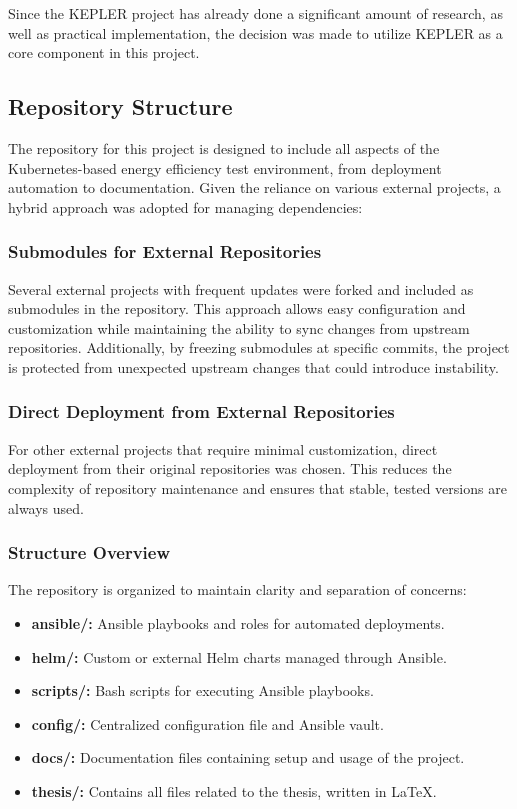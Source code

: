 Since the KEPLER project has already done a significant amount of research, as well as practical implementation, the decision was made to utilize KEPLER as a core component in this project. 

\subsection{Repository Structure}

The repository for this project is designed to include all aspects of the Kubernetes-based energy efficiency test environment, from deployment automation to documentation. Given the reliance on various external projects, a hybrid approach was adopted for managing dependencies:

\subsubsection{Submodules for External Repositories}
Several external projects with frequent updates were forked and included as submodules in the repository. This approach allows easy configuration and customization while maintaining the ability to sync changes from upstream repositories. Additionally, by freezing submodules at specific commits, the project is protected from unexpected upstream changes that could introduce instability.

\subsubsection{Direct Deployment from External Repositories}
For other external projects that require minimal customization, direct deployment from their original repositories was chosen. This reduces the complexity of repository maintenance and ensures that stable, tested versions are always used.

\subsubsection{Structure Overview}
The repository is organized to maintain clarity and separation of concerns:
\begin{itemize}
    \item \textbf{ansible/:} Ansible playbooks and roles for automated deployments.
    \item \textbf{helm/:} Custom or external Helm charts managed through Ansible.
    \item \textbf{scripts/:} Bash scripts for executing Ansible playbooks.
    \item \textbf{config/:} Centralized configuration file and Ansible vault.
    \item \textbf{docs/:} Documentation files containing setup and usage of the project.
    \item \textbf{thesis/:} Contains all files related to the thesis, written in LaTeX.
\end{itemize}

